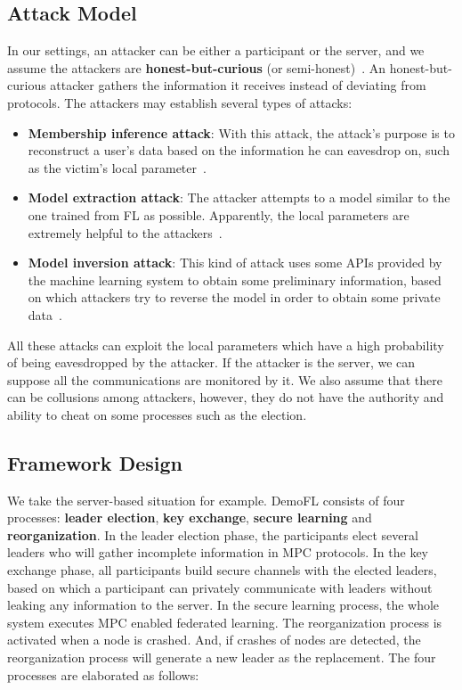 \subsection{Attack Model}
In our settings, an attacker can be either a participant or the server, and we assume the attackers are \textbf{honest-but-curious} (or semi-honest)~\cite{Semi-honest}. An honest-but-curious attacker gathers the information it receives instead of deviating from protocols. The attackers may establish several types of attacks:

\begin{itemize}
    \item \textbf{Membership inference attack}: With this attack, the attack's purpose is to reconstruct a user's data based on the information he can eavesdrop on, such as the victim's local parameter~\cite{Shokri17}.

    \item \textbf{Model extraction attack}: The attacker attempts to a model similar to the one trained from FL as possible. Apparently, the local parameters are extremely helpful to the attackers~\cite{Tramer16}.

    \item \textbf{Model inversion attack}: This kind of attack uses some APIs provided by the machine learning system to obtain some preliminary information, based on which attackers try to reverse the model in order to obtain some private data~\cite{Fredrikson15}.

\end{itemize}

All these attacks can exploit the local parameters which have a high probability of being eavesdropped by the attacker. If the attacker is the server, we can suppose all the communications are monitored by it. We also assume that there can be collusions among attackers, however, they do not have the authority and ability to cheat on some processes such as the election.


\subsection{Framework Design}
We take the server-based situation for example. DemoFL consists of four processes: \textbf{leader election}, \textbf{key exchange}, \textbf{secure learning} and \textbf{reorganization}. In the leader election phase, the participants elect several leaders who will gather incomplete information in MPC protocols. In the key exchange phase, all participants build secure channels with the elected leaders, based on which a participant can privately communicate with leaders without leaking any information to the server. In the secure learning process, the whole system executes MPC enabled federated learning. The reorganization process is activated when a node is crashed. And, if crashes of nodes are detected, the reorganization process will generate a new leader as the replacement. The four processes are elaborated as follows:

